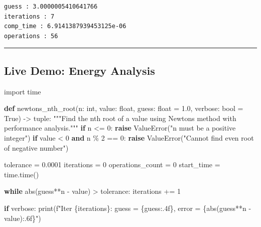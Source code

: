 \documentclass[
  letterpaper,
  DIV=11,
  numbers=noendperiod]{scrartcl}
\newenvironment{Shaded}{\begin{snugshade}}{\end{snugshade}}
\newcommand{\BuiltInTok}[1]{\textcolor[rgb]{0.00,0.23,0.31}{#1}}
\newcommand{\CommentTok}[1]{\textcolor[rgb]{0.37,0.37,0.37}{#1}}
\newcommand{\ControlFlowTok}[1]{\textcolor[rgb]{0.00,0.23,0.31}{\textbf{#1}}}
\newcommand{\DecValTok}[1]{\textcolor[rgb]{0.68,0.00,0.00}{#1}}
\newcommand{\FloatTok}[1]{\textcolor[rgb]{0.68,0.00,0.00}{#1}}
\newcommand{\ImportTok}[1]{\textcolor[rgb]{0.00,0.46,0.62}{#1}}
\newcommand{\KeywordTok}[1]{\textcolor[rgb]{0.00,0.23,0.31}{\textbf{#1}}}
\newcommand{\NormalTok}[1]{\textcolor[rgb]{0.00,0.23,0.31}{#1}}
\newcommand{\OperatorTok}[1]{\textcolor[rgb]{0.37,0.37,0.37}{#1}}
\newcommand{\PreprocessorTok}[1]{\textcolor[rgb]{0.68,0.00,0.00}{#1}}
\newcommand{\SpecialCharTok}[1]{\textcolor[rgb]{0.37,0.37,0.37}{#1}}
\newcommand{\SpecialStringTok}[1]{\textcolor[rgb]{0.13,0.47,0.30}{#1}}
\newcommand{\StringTok}[1]{\textcolor[rgb]{0.13,0.47,0.30}{#1}}
\newcommand{\VariableTok}[1]{\textcolor[rgb]{0.07,0.07,0.07}{#1}}
\begin{document}
\begin{verbatim}
guess : 3.0000005410641766
iterations : 7
comp_time : 6.9141387939453125e-06
operations : 56
\end{verbatim}

\begin{center}\rule{0.5\linewidth}{0.5pt}\end{center}

\subsection{Live Demo: Energy Analysis}\label{live-demo-energy-analysis}

\begin{Shaded}
\begin{Highlighting}[]
\ImportTok{import}\NormalTok{ time}

\KeywordTok{def}\NormalTok{ newtons\_nth\_root(n: }\BuiltInTok{int}\NormalTok{, value: }\BuiltInTok{float}\NormalTok{, guess: }\BuiltInTok{float} \OperatorTok{=} \FloatTok{1.0}\NormalTok{, verbose: }\BuiltInTok{bool} \OperatorTok{=} \VariableTok{True}\NormalTok{) }\OperatorTok{{-}\textgreater{}} \BuiltInTok{tuple}\NormalTok{:}
    \CommentTok{"""Find the nth root of a value using Newton\textquotesingle{}s method with performance analysis."""}
    \ControlFlowTok{if}\NormalTok{ n }\OperatorTok{\textless{}=} \DecValTok{0}\NormalTok{:}
        \ControlFlowTok{raise} \PreprocessorTok{ValueError}\NormalTok{(}\StringTok{"n must be a positive integer"}\NormalTok{)}
    \ControlFlowTok{if}\NormalTok{ value }\OperatorTok{\textless{}} \DecValTok{0} \KeywordTok{and}\NormalTok{ n }\OperatorTok{\%} \DecValTok{2} \OperatorTok{==} \DecValTok{0}\NormalTok{:}
        \ControlFlowTok{raise} \PreprocessorTok{ValueError}\NormalTok{(}\StringTok{"Cannot find even root of negative number"}\NormalTok{)}
    
\NormalTok{    tolerance }\OperatorTok{=} \FloatTok{0.0001}
\NormalTok{    iterations }\OperatorTok{=} \DecValTok{0}
\NormalTok{    operations\_count }\OperatorTok{=} \DecValTok{0}
\NormalTok{    start\_time }\OperatorTok{=}\NormalTok{ time.time()}
    
    \ControlFlowTok{while} \BuiltInTok{abs}\NormalTok{(guess}\OperatorTok{**}\NormalTok{n }\OperatorTok{{-}}\NormalTok{ value) }\OperatorTok{\textgreater{}}\NormalTok{ tolerance:}
\NormalTok{        iterations }\OperatorTok{+=} \DecValTok{1}
        
        \ControlFlowTok{if}\NormalTok{ verbose:}
            \BuiltInTok{print}\NormalTok{(}\SpecialStringTok{f"Iter }\SpecialCharTok{\{}\NormalTok{iterations}\SpecialCharTok{\}}\SpecialStringTok{: guess = }\SpecialCharTok{\{}\NormalTok{guess}\SpecialCharTok{:.4f\}}\SpecialStringTok{, error = }\SpecialCharTok{\{}\BuiltInTok{abs}\NormalTok{(guess}\OperatorTok{**}\NormalTok{n }\OperatorTok{{-}}\NormalTok{ value)}\SpecialCharTok{:.6f\}}\SpecialStringTok{"}\NormalTok{)}
        

\end{Highlighting}
\end{Shaded}
\end{document}
